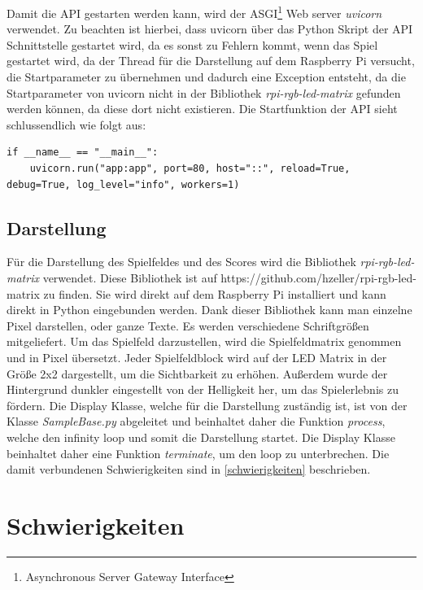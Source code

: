 \documentclass[a4paper,12pt]{scrartcl}
\begin{document}
Damit die API gestarten werden kann, wird der ASGI\footnote{Asynchronous Server Gateway Interface} Web server \textit{uvicorn} verwendet. Zu beachten ist hierbei, dass uvicorn über das Python Skript der API Schnittstelle gestartet wird, da es sonst zu Fehlern kommt, wenn das Spiel gestartet wird, da der Thread für die Darstellung auf dem Raspberry Pi versucht, die Startparameter zu übernehmen und dadurch eine Exception entsteht, da die Startparameter von uvicorn nicht in der Bibliothek \textit{rpi-rgb-led-matrix} gefunden werden können, da diese dort nicht existieren. Die Startfunktion der API sieht schlussendlich wie folgt aus:

\begin{lstlisting}
if __name__ == "__main__":
    uvicorn.run("app:app", port=80, host="::", reload=True, debug=True, log_level="info", workers=1)
\end{lstlisting}

\subsection{Darstellung}

Für die Darstellung des Spielfeldes und des Scores wird die Bibliothek \textit{rpi-rgb-led-matrix} verwendet. Diese Bibliothek ist auf https://github.com/hzeller/rpi-rgb-led-matrix zu finden. Sie wird direkt auf dem Raspberry Pi installiert und kann direkt in Python eingebunden werden. Dank dieser Bibliothek kann man einzelne Pixel darstellen, oder ganze Texte. Es werden verschiedene Schriftgrößen mitgeliefert. Um das Spielfeld darzustellen, wird die Spielfeldmatrix genommen und in Pixel übersetzt. Jeder Spielfeldblock wird auf der LED Matrix in der Größe 2x2 dargestellt, um die Sichtbarkeit zu erhöhen. Außerdem wurde der Hintergrund dunkler eingestellt von der Helligkeit her, um das Spielerlebnis zu fördern. Die Display Klasse, welche für die Darstellung zuständig ist, ist von der Klasse \textit{SampleBase.py} abgeleitet und beinhaltet daher die Funktion \textit{process}, welche den infinity loop und somit die Darstellung startet. Die Display Klasse beinhaltet daher eine Funktion \textit{terminate}, um den loop zu unterbrechen. Die damit verbundenen Schwierigkeiten sind in \autoref{schwierigkeiten} beschrieben.


\section{Schwierigkeiten}
\label{schwierigkeiten}
\end{document}
